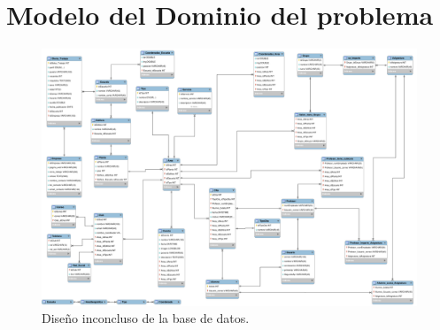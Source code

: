 \documentclass[oneside,10pt]{book}
\begin{document}
\chapter{Modelo del Dominio del problema}

	\begin{figure}[htbp!]
		\centering
			\includegraphics[width=1\textwidth]{images/baseDeDatos}
		\caption{Diseño inconcluso de la base de datos.}
	\end{figure}



\end{document}
